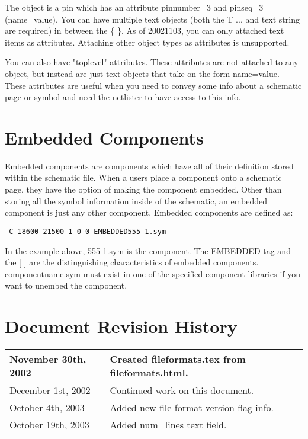 \documentclass{article}
\begin{document}
        The object is a pin which has an attribute pinnumber=3 and
pinseq=3 (name=value).  You can have multiple text objects (both the T
... and text string are required) in between the \{ \}.  As of 20021103,
you can only attached text items as attributes.  Attaching other object
types as attributes is unsupported.

        You can also have "toplevel" attributes.  These attributes are not
attached to any object, but instead are just text objects that take
on the form name=value.  These attributes are useful when you need to
convey some info about a schematic page or symbol and need the netlister
to have access to this info.


\section{Embedded Components}

	Embedded components are components which have all of their definition
stored within the schematic file.  When a users place a component onto a
schematic page, they have the option of making the component embedded.  Other
than storing all the symbol information inside of the schematic, an embedded
component is just any other component.  Embedded components are defined as:

{\tt
C 18600 21500 1 0 0 EMBEDDED555-1.sym  \newline
}

In the example above, 555-1.sym is the component.  The EMBEDDED tag and
the [ ] are the distinguishing characteristics of embedded components.
componentname.sym must exist in one of the specified component-libraries
if you want to unembed the component.


\newpage
\section{Document Revision History}

\begin{table}[h]
\begin{tabular}{|l|l|} \hline
November 30th, 2002 & Created fileformats.tex from fileformats.html. \\ \hline
December 1st, 2002 & Continued work on this document. \\ \hline
October 4th, 2003 & Added new file format version flag info. \\ \hline
October 19th, 2003 & Added num\_lines text field. \\ \hline
\end{tabular}
\end{table}
\end{document}
